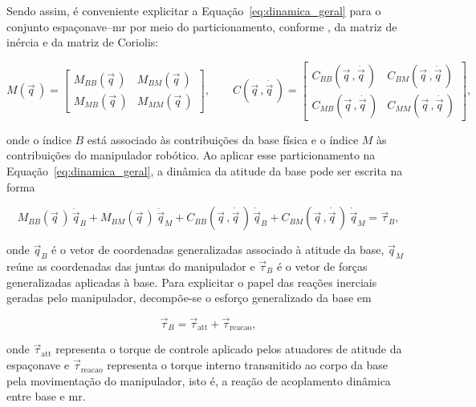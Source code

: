 Sendo assim, é conveniente explicitar a Equação~\eqref{eq:dinamica_geral}
para o conjunto espaçonave--\gls{mr} por meio do particionamento,
conforme \cite{featherstone2008,Wilde2018}, da matriz de inércia e da
matriz de Coriolis:

\begin{equation}
M(\vec q\,) =
\begin{bmatrix}
M_{BB}(\vec q\,) & M_{BM}(\vec q\,) \\
M_{MB}(\vec q\,) & M_{MM}(\vec q\,)
\end{bmatrix},
\qquad
C(\vec q\,,\dot{\vec q\,}) =
\begin{bmatrix}
C_{BB}(\vec q\,,\dot{\vec q\,}) & C_{BM}(\vec q\,,\dot{\vec q\,}) \\
C_{MB}(\vec q\,,\dot{\vec q\,}) & C_{MM}(\vec q\,,\dot{\vec q\,})
\end{bmatrix},
\label{eq:particionamento_M_C}
\end{equation}

onde o índice $B$ está associado às contribuições da base física e o
índice $M$ às contribuições do manipulador robótico.
Ao aplicar esse particionamento na Equação~\eqref{eq:dinamica_geral},
a dinâmica da atitude da base pode ser escrita na forma

\begin{equation}
M_{BB}(\vec q\,)\,\ddot{\vec q}_B
+
M_{BM}(\vec q\,)\,\ddot{\vec q}_M
+
C_{BB}(\vec q\,,\dot{\vec q\,})\,\dot{\vec q}_B
+
C_{BM}(\vec q\,,\dot{\vec q\,})\,\dot{\vec q}_M
=
\vec\tau_B,
\label{eq:dinAcoplada_base_compacta}
\end{equation}

onde $\vec q_B$ é o vetor de coordenadas generalizadas associado à
atitude da base, $\vec q_M$ reúne as coordenadas das juntas do
manipulador e $\vec\tau_B$ é o vetor de forças generalizadas aplicadas
à base.
Para explicitar o papel das reações inerciais geradas pelo
manipulador, decompõe-se o esforço generalizado da base em

\begin{equation}
\vec\tau_B
=
\vec\tau_{\text{att}}
+
\vec\tau_{\text{reacao}},
\end{equation}

onde $\vec\tau_{\text{att}}$ representa o torque de controle aplicado
pelos atuadores de atitude da espaçonave e $\vec\tau_{\text{reacao}}$
representa o torque interno transmitido ao corpo da base pela
movimentação do manipulador, isto é, a reação de acoplamento dinâmica
entre base e \gls{mr}. 